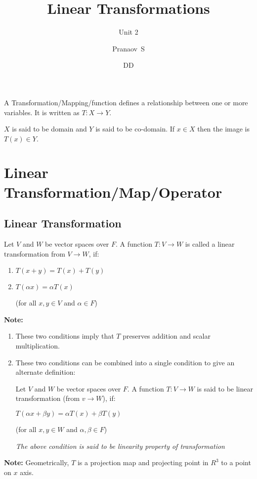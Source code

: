 \documentclass[english,course,fleqn]{lecture}
\title{Linear Transformations}
\subtitle{Unit 2}
\author{Pranaov\ S}
\date{DD}{MM}{YYYY}
\begin{document}
\newpage

A Transformation/Mapping/function defines a relationship between one or more variables.
It is written as $T:X\rightarrow Y$.

$X$ is said to be domain and $Y$ is said to be co-domain.
If $x \in X$ then the image is $T(x)\in Y$.

\section{Linear Transformation/Map/Operator}

\subsection{Linear Transformation}

\begin{definition}
	Let $V$ and $W$ be vector spaces over $F$.
	A function $T:V \rightarrow W$ is called a linear transformation from $V \rightarrow W$, if:

	\begin{enumerate}
		\item $T(x+y) = T(x) + T(y)$
		\item $T(\alpha x) = \alpha T(x)$

		      (for all $x,y \in V$ and $\alpha \in F$)
	\end{enumerate}
\end{definition}

\textbf{Note:}
\begin{enumerate}
	\item These two conditions imply that $T$ preserves addition and scalar multiplication.
	\item These two conditions can be combined into a single condition to give an alternate definition:

	      Let $V$ and $W$ be vector spaces over $F$.
	      A function $T:V \rightarrow W$ is said to be linear transformation (from $v \rightarrow W$), if:

	      $T(\alpha x + \beta y) = \alpha T(x) + \beta T(y)$

	      (for all $x,y \in W$ and $\alpha,\beta \in F$)

	      \textit{The above condition is said to be linearity property of transformation}

\end{enumerate}

\textbf{Note:} Geometrically, $T$ is a projection map and projecting point in $R^{3}$ to a point on $x$ axis.
\end{document}
